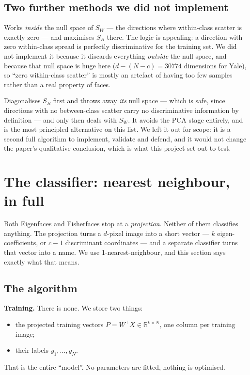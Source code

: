 \documentclass[11pt]{article}
\theoremstyle{definition}
\theoremstyle{remark}
\newcommand{\Sw}{S_W}
\newcommand{\Sb}{S_B}
\newcommand{\R}{\mathbb{R}}
\begin{document}
\subsection{Two further methods we did not implement}

\begin{description}[leftmargin=*,style=nextline]
\item[Null-space LDA.]
  Works \emph{inside} the null space of $\Sw$ --- the directions where
  within-class scatter is exactly zero --- and maximises $\Sb$ there. The logic is
  appealing: a direction with zero within-class spread is perfectly discriminative
  for the training set. We did not implement it because it discards everything
  \emph{outside} the null space, and because that null space is huge here
  ($d - (N-c) = 30774$ dimensions for Yale), so ``zero within-class scatter'' is
  mostly an artefact of having too few samples rather than a real property of
  faces.
\item[Direct LDA (Yu \& Yang).]
  Diagonalises $\Sb$ first and throws away \emph{its} null space --- which is safe,
  since directions with no between-class scatter carry no discriminative
  information by definition --- and only then deals with $\Sw$. It avoids the PCA
  stage entirely, and is the most principled alternative on this list. We left it
  out for scope: it is a second full algorithm to implement, validate and defend,
  and it would not change the paper's qualitative conclusion, which is what this
  project set out to test.
\end{description}

\section{The classifier: nearest neighbour, in full}
\label{sec:nn}

Both Eigenfaces and Fisherfaces stop at a \emph{projection}. Neither of them
classifies anything. The projection turns a $d$-pixel image into a short vector
--- $k$ eigen-coefficients, or $c-1$ discriminant coordinates --- and a separate
classifier turns that vector into a name. We use 1-nearest-neighbour, and this
section says exactly what that means.

\subsection{The algorithm}

\textbf{Training.} There is none. We store two things:
\begin{itemize}[nosep]
\item the projected training vectors $P = W^{\!\top}X \in \R^{k\times N}$, one
      column per training image;
\item their labels $y_1,\dots,y_N$.
\end{itemize}
That is the entire ``model''. No parameters are fitted, nothing is optimised.
\end{document}
